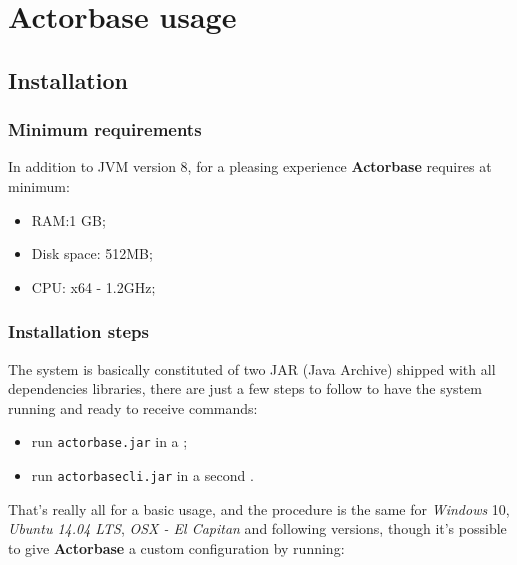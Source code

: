 \documentclass{scalatekids-article}
\begin{document}




\section{Actorbase usage}

\subsection{Installation}

\subsubsection{Minimum requirements}

In addition to JVM version 8, for a pleasing experience \textbf{Actorbase} requires at minimum:
\begin{itemize}
\item RAM:\@1 GB;\@
\item Disk space: 512MB;\@
\item CPU: x64 - 1.2GHz;
\end{itemize}

\subsubsection{Installation steps}

The system is basically constituted of two JAR (Java Archive) shipped with all
dependencies libraries, there are just a few steps to follow to have the system
running and ready to receive commands:
\begin{itemize}
\item run \verb=actorbase.jar= in a ;
\item run \verb=actorbasecli.jar= in a second .
\end{itemize}
That's really all for a basic usage, and the procedure is the same for
\textit{Windows} 10, \textit{Ubuntu 14.04 LTS}, \textit{OSX - El
  Capitan} and following versions, though it's possible to give \textbf{Actorbase} a custom configuration by
running:
\end{document}
